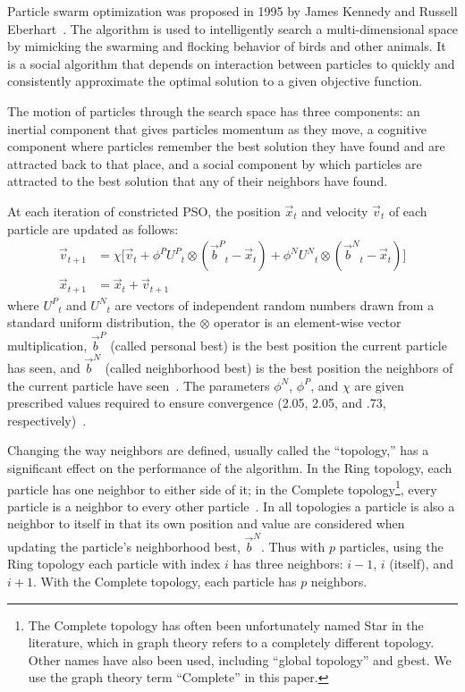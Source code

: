 \documentclass[smallcondensed]{svjour3}
\providecommand{\pers}{\ensuremath{P}}
\providecommand{\neigh}{\ensuremath{N}}
\providecommand{\nURand}{\ensuremath{U^\neigh}}
\providecommand{\pURand}{\ensuremath{U^\pers}}
\providecommand{\ppos}{\ensuremath{\Vec{x}}}
\providecommand{\pvel}{\ensuremath{\Vec{v}}}
\providecommand{\nbest}{\ensuremath{\Vec{b}^\neigh}}
\providecommand{\pbest}{\ensuremath{\Vec{b}^\pers}}
\providecommand{\constriction}{\ensuremath{\chi}}
\providecommand{\ncoeff}{\ensuremath{\phi^\neigh}}
\providecommand{\pcoeff}{\ensuremath{\phi^\pers}}
\begin{document}
Particle swarm optimization was proposed in 1995 by James Kennedy and Russell
Eberhart~\citep{kennedy-1995-particle-swarm-optimization}.  The algorithm is
used to intelligently search a multi-dimensional space by mimicking the
swarming and flocking behavior of birds and other animals. It is a social
algorithm that depends on interaction between particles to quickly and
consistently approximate the optimal solution to a given objective function.

The motion of particles through the search space has three components: an
inertial component that gives particles momentum as they move, a cognitive
component where particles remember the best solution they have found and are
attracted back to that place, and a social component by which particles are
attracted to the best solution that any of their neighbors have found.

At each iteration of constricted PSO, the position $\ppos_t$ and velocity
$\pvel_t$ of each particle are updated as follows:
\begin{align}
\label{eq:velupdate}
	\pvel_{t+1} &=
		\constriction \bigl[ \pvel_t
			+ \pcoeff\pURand_{t}\otimes(\pbest_{t} - \ppos_{t}) +
			\ncoeff\nURand_{t}\otimes(\nbest_{t} - \ppos_{t})
		\bigr] \\
\label{eq:posupdate}
	\ppos_{t+1} &= \ppos_{t} + \pvel_{t+1}
\end{align}
where \( \pURand_{t} \) and \( \nURand_{t} \) are vectors of independent random
numbers drawn from a standard uniform distribution, the \( \otimes \) operator
is an element-wise vector multiplication, $\pbest$ (called personal best) is
the best position the current particle has seen, and $\nbest$ (called
neighborhood best) is the best position the neighbors of the current particle
have seen~\citep{bratton-2007-defining-a-standard-for-pso}.  The parameters \(
\ncoeff \), \( \pcoeff \), and \( \constriction \) are given prescribed values
required to ensure convergence (2.05, 2.05, and .73,
respectively)~\citep{clerc-2002-constricted-pso}. 

Changing the way neighbors are defined, usually called the ``topology,'' has a
significant effect on the performance of the algorithm.  In the Ring topology,
each particle has one neighbor to either side of it; in the Complete
topology\footnote{The Complete topology has often been unfortunately named Star
in the literature, which in graph theory refers to a completely different
topology.  Other names have also been used, including ``global topology'' and
gbest.  We use the graph theory term ``Complete'' in this paper.}, every
particle is a neighbor to every other
particle~\citep{bratton-2007-defining-a-standard-for-pso}.  In all topologies a
particle is also a neighbor to itself in that its own position and value are
considered when updating the particle's neighborhood best, $\nbest$.  Thus with
$p$ particles, using the Ring topology each particle with index $i$ has three
neighbors: $i-1$, $i$ (itself), and $i+1$.  With the Complete topology, each
particle has $p$ neighbors.
\end{document}
